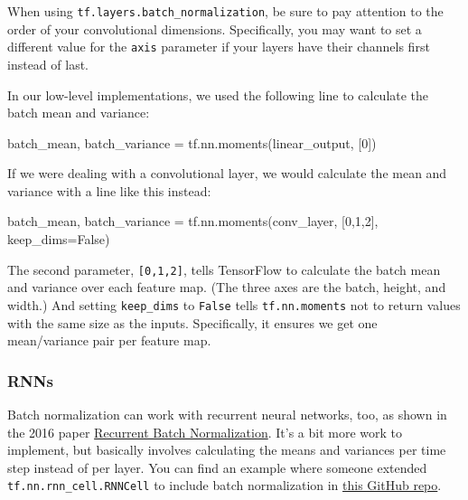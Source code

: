 \documentclass[11pt]{article}
\newenvironment{Shaded}{}{}
\newcommand{\DecValTok}[1]{\textcolor[rgb]{0.25,0.63,0.44}{{#1}}}
\newcommand{\NormalTok}[1]{{#1}}
\newcommand{\VariableTok}[1]{\textcolor[rgb]{0.10,0.09,0.49}{{#1}}}
\newcommand{\OperatorTok}[1]{\textcolor[rgb]{0.40,0.40,0.40}{{#1}}}
\begin{document}
When using \texttt{tf.layers.batch\_normalization}, be sure to pay
attention to the order of your convolutional dimensions. Specifically,
you may want to set a different value for the \texttt{axis} parameter if
your layers have their channels first instead of last.

In our low-level implementations, we used the following line to
calculate the batch mean and variance:

\begin{Shaded}
\begin{Highlighting}[]
\NormalTok{batch_mean, batch_variance }\OperatorTok{=}\NormalTok{ tf.nn.moments(linear_output, [}\DecValTok{0}\NormalTok{])}
\end{Highlighting}
\end{Shaded}

If we were dealing with a convolutional layer, we would calculate the
mean and variance with a line like this instead:

\begin{Shaded}
\begin{Highlighting}[]
\NormalTok{batch_mean, batch_variance }\OperatorTok{=}\NormalTok{ tf.nn.moments(conv_layer, [}\DecValTok{0}\NormalTok{,}\DecValTok{1}\NormalTok{,}\DecValTok{2}\NormalTok{], keep_dims}\OperatorTok{=}\VariableTok{False}\NormalTok{)}
\end{Highlighting}
\end{Shaded}

The second parameter, \texttt{{[}0,1,2{]}}, tells TensorFlow to
calculate the batch mean and variance over each feature map. (The three
axes are the batch, height, and width.) And setting \texttt{keep\_dims}
to \texttt{False} tells \texttt{tf.nn.moments} not to return values with
the same size as the inputs. Specifically, it ensures we get one
mean/variance pair per feature map.

\hypertarget{rnns}{%
\subsubsection{RNNs}\label{rnns}}

Batch normalization can work with recurrent neural networks, too, as
shown in the 2016 paper
\href{https://arxiv.org/abs/1603.09025}{Recurrent Batch Normalization}.
It's a bit more work to implement, but basically involves calculating
the means and variances per time step instead of per layer. You can find
an example where someone extended \texttt{tf.nn.rnn\_cell.RNNCell} to
include batch normalization in
\href{https://gist.github.com/spitis/27ab7d2a30bbaf5ef431b4a02194ac60}{this
GitHub repo}.


    
    
    
    
\end{document}
